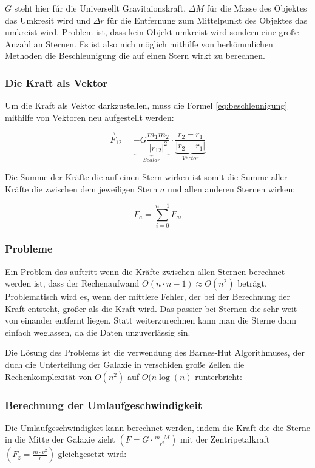 \documentclass[a4paper, 10pt]{article}
\begin{document}
\begin{multicols*}{2}
\( G \) steht hier fúr die Universellt Gravitaionskraft, \( \Delta M \) für die
Masse des Objektes das Umkresit wird und \( \Delta r \) für die Entfernung zum
Mittelpunkt des Objektes das umkreist wird.
Problem ist, dass kein Objekt umkreist wird sondern eine große Anzahl an Sternen.
Es ist also nich möglich mithilfe von herkömmlichen Methoden die Beschleunigung
die auf einen Stern wirkt zu berechnen.

\subsubsection{Die Kraft als Vektor}
Um die Kraft als Vektor darkzustellen, muss die Formel \ref{eq:beschleunigung}
mithilfe von Vektoren neu aufgestellt werden:

\begin{equation} \vec{F}_{12} = \underbrace{-G \frac{m_1 m_2}{|r_{12}|^2}}_{Scalar}
\cdot \underbrace{\frac{r_2 - r_1}{|r_2 - r_1|}}_{Vector} \end{equation}

Die Summe der Kräfte die auf einen Stern wirken ist somit die Summe aller
Kräfte die zwischen dem jeweiligen Stern \( a \) und allen anderen Sternen
wirken:

\begin{equation} F_{a} = \sum_{i=0}^{n-1} F_{ai} \end{equation}

\subsubsection{Probleme}
Ein Problem das auftritt wenn die Kräfte zwischen allen Sternen berechnet
werden ist, dass der Rechenaufwand \( O(n \cdot n-1) \approx O(n^2) \) beträgt.
Problematisch wird es, wenn der mittlere Fehler, der bei der Berechnung der
Kraft entsteht, größer als die Kraft wird. Das passier bei Sternen die sehr
weit von einander entfernt liegen.  Statt weiterzurechnen kann man die Sterne
dann einfach weglassen, da die Daten unzuverlässig sin.

Die Lösung des Problems ist die verwendung des Barnes-Hut Algorithmuses, der
duch die Unterteilung der Galaxie in verschiden große Zellen die
Rechenkomplexität von \( O(n^2) \) auf \( O(n \log(n) \) runterbricht:

\subsubsection{Berechnung der Umlaufgeschwindigkeit}
Die Umlaufgeschwindigket kann berechnet werden, indem die Kraft die die Sterne
in die Mitte der Galaxie zieht \( \left( F = G \cdot \frac{m \cdot M}{r^2}
\right) \) mit der Zentripetalkraft \( \left( F_z = \frac{m \cdot v^2}{r}
\right)\) gleichgesetzt wird:


\end{multicols*}
\end{document}

